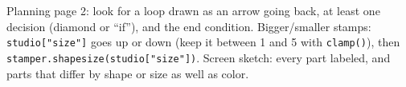 \begin{answer}
Planning page 2: look for a loop drawn as an arrow going back, at least one decision (diamond or \enquote{if}), and the end condition.
Bigger/smaller stamps: \texttt{studio["size"]} goes up or down (keep it between 1 and 5 with \texttt{clamp()}), then \texttt{stamper.shapesize(studio["size"])}.
Screen sketch: every part labeled, and parts that differ by shape or size as well as color.
\end{answer}
